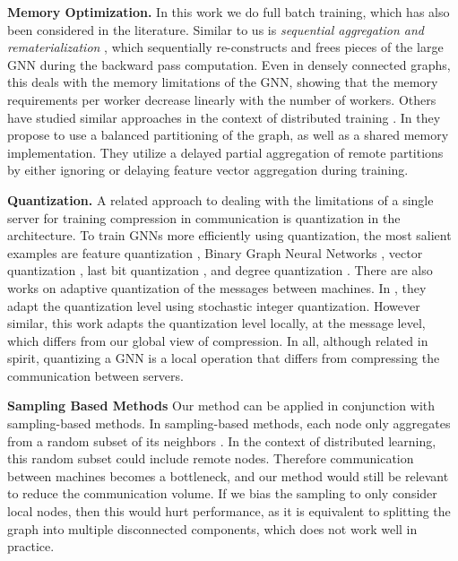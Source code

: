 \documentclass[lettersize,journal]{IEEEtran}
\begin{document}
\textbf{Memory Optimization.} In this work we do full batch training, which has also been considered in the literature. Similar to us is \textit{sequential aggregation and rematerialization} \cite{mostafa2022sequential}, which sequentially re-constructs and frees pieces of the large GNN during the backward pass computation. Even in densely connected graphs, this deals with the memory limitations of the GNN, showing that the memory requirements per worker decrease linearly with the number of workers. Others have studied similar approaches in the context of distributed training \cite{mostafa2023fastsample}. In \cite{md2021distgnn} they propose to use a balanced partitioning of the graph, as well as a shared memory implementation. They utilize a delayed partial aggregation of remote partitions by either ignoring or delaying feature vector aggregation during training. 

\textbf{Quantization.} A related approach to dealing with the limitations of a single server for training compression in communication is quantization in the architecture. To train GNNs more efficiently using quantization, the most salient examples are feature quantization \cite{ma2022bifeat}, Binary
Graph Neural Networks \cite{bahri2021binary}, vector quantization \cite{ding2021vq}, last bit quantization \cite{feng2020sgquant}, and degree quantization \cite{tailor2020degree}. There are also works on adaptive quantization of the messages between machines. In \cite{wan2023adaptive}, they adapt the quantization level using stochastic integer quantization. However similar, this work adapts the quantization level locally, at the message level, which differs from our global view of compression. In all, although related in spirit, quantizing a GNN is a local operation that differs from compressing the communication between servers. 


\textbf{Sampling Based Methods}
Our method can be applied in conjunction with sampling-based methods. In sampling-based methods, each node only aggregates from a random subset of its neighbors \cite{NEURIPS2021_a378383b,bai2021efficient,serafini2021scalable,liu2021pick}. In the context of distributed learning, this random subset could include remote nodes. Therefore communication between machines becomes a bottleneck, and our method would still be relevant to reduce the communication volume. If we bias the sampling to only consider local nodes, then this would hurt performance, as it is equivalent to splitting the graph into multiple disconnected components, which does not work well in practice.
\end{document}
